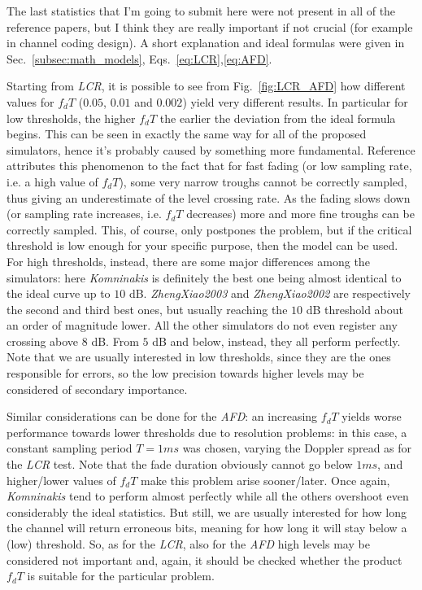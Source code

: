 The last statistics that I'm going to submit here were not present in all of the reference papers, but I think they are really important if not crucial (for example in channel coding design). A short explanation and ideal formulas were given in Sec.~\ref{subsec:math_models}, Eqs.~\ref{eq:LCR},\ref{eq:AFD}.

Starting from \textit{LCR}, it is possible to see from Fig.~\ref{fig:LCR_AFD} how different values for $f_dT$ ($0.05$, $0.01$ and $0.002$) yield very different results. In particular for low thresholds, the higher $f_dT$ the earlier the deviation from the ideal formula begins. This can be seen in exactly the same way for all of the proposed simulators, hence it's probably caused by something more fundamental. Reference \cite{A3} attributes this phenomenon to the fact that for fast fading (or low sampling rate, i.e. a high value of $f_dT$), some very narrow troughs cannot be correctly sampled, thus giving an underestimate of the level crossing rate. As the fading slows down (or sampling rate increases, i.e. $f_dT$ decreases) more and more fine troughs can be correctly sampled. This, of course, only postpones the problem, but if the critical threshold is low enough for your specific purpose, then the model can be used.
For high thresholds, instead, there are some major differences among the simulators: here \textit{Komninakis} is definitely the best one being almost identical to the ideal curve up to $10$ dB. \textit{ZhengXiao2003} and \textit{ZhengXiao2002} are respectively the second and third best ones, but usually reaching the $10$ dB threshold about an order of magnitude lower. All the other simulators do not even register any crossing above $8$ dB. From $5$ dB and below, instead, they all perform perfectly. Note that we are usually interested in low thresholds, since they are the ones responsible for errors, so the low precision towards higher levels may be considered of secondary importance.

Similar considerations can be done for the \textit{AFD}: an increasing $f_dT$ yields worse performance towards lower thresholds due to resolution problems: in this case, a constant sampling period $T=1 ms$ was chosen, varying the Doppler spread as for the \textit{LCR} test. Note that the fade duration obviously cannot go below $1ms$, and higher/lower values of $f_dT$ make this problem arise sooner/later. Once again, \textit{Komninakis} tend to perform almost perfectly while all the others overshoot even considerably the ideal statistics. But still, we are usually interested for how long the channel will return erroneous bits, meaning for how long it will stay below a (low) threshold. So, as for the \textit{LCR}, also for the \textit{AFD} high levels may be considered not important and, again, it should be checked whether the product $f_dT$ is suitable for the particular problem.

